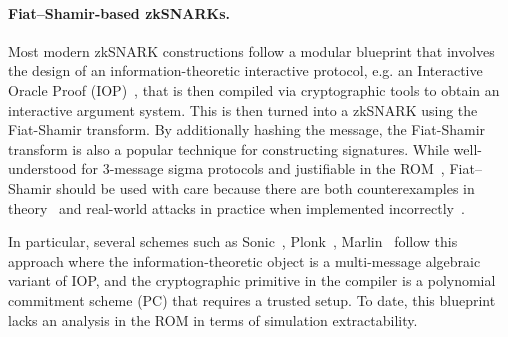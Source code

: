 
\paragraph{Fiat--Shamir-based zkSNARKs.}
Most modern zkSNARK constructions follow a modular blueprint that involves the design of an information-theoretic interactive protocol, e.g. an Interactive Oracle Proof (IOP)~\cite{TCC:BenChiSpo16}, that is then compiled via cryptographic tools to obtain an interactive argument system. This is then turned into a zkSNARK using the Fiat-Shamir transform. By additionally hashing the message, the Fiat-Shamir transform is also a popular technique for constructing signatures. While well-understood for 3-message sigma protocols and justifiable in the ROM~\cite{CCS:BelRog93}, Fiat--Shamir should be used with
care because there are both counterexamples in theory~\cite{FOCS:GolKal03} and real-world attacks in practice when implemented incorrectly~\cite{Blog:FrozenHeart20}.

%

In particular, several schemes such as
Sonic~\cite{CCS:MBKM19}, Plonk~\cite{EPRINT:GabWilCio19}, Marlin~\cite{EC:CHMMVW20} 
follow this approach where the information-theoretic object is a multi-message algebraic variant of IOP, and the cryptographic primitive in the compiler is a polynomial commitment scheme (PC) that requires a trusted setup. To date, this blueprint lacks an analysis in the ROM in terms of simulation extractability.


